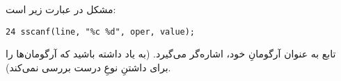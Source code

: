 \section{}
\paragraph{}\label{answer:95}
مشکل در عبارت زیر است:
\begin{LTR}
    \begin{lstlisting}[style=C++Style]
        24 sscanf(line, "%c %d", oper, value);
    \end{lstlisting}
\end{LTR}

تابع  به عنوان آرگومانِ خود، اشاره‌گر می‌گیرد. (به یاد داشته باشید که  آرگومان‌ها را برای داشتنِ نوعِ درست بررسی نمی‌کند).
